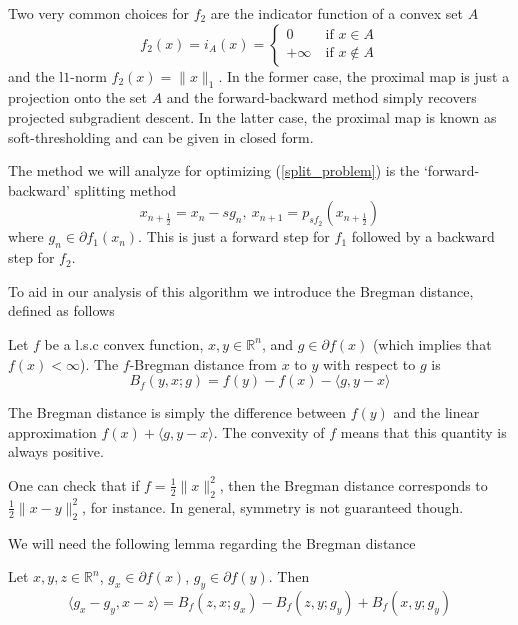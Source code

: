 Two very common choices for $f_2$ are the indicator function of a convex set $A$
\begin{equation}
 f_2(x) = i_A(x) = 
 \begin{cases}
                    0 &~ \text{if $x\in A$} \\
		    +\infty &~ \text{if $x\notin A$}
 \end{cases}
\end{equation}
and the l$1$-norm $f_2(x) = \|x\|_1$. In the former case, the proximal map is just a projection onto the set $A$ and
the forward-backward method simply recovers projected subgradient descent. In the latter case, the
proximal map is known as soft-thresholding and can be given in closed form.

The method we will analyze for optimizing (\ref{split_problem}) is the `forward-backward' splitting method
\begin{equation}\label{subgradient_forward_backward}
 x_{n+\frac{1}{2}} = x_n - sg_n,~x_{n+1} = p_{sf_2}(x_{n+\frac{1}{2}})
\end{equation}
where $g_n\in \partial f_1(x_n)$. This is just a forward step for $f_1$ followed by a backward step for
$f_2$.

To aid in our analysis of this algorithm we introduce the Bregman distance, defined as follows
\begin{definition}
 Let $f$ be a l.s.c convex function, $x, y\in \mathbb{R}^n$, and $g\in \partial f(x)$ (which implies that
 $f(x) < \infty$). The $f$-Bregman distance from $x$ to $y$ with respect to $g$ is
 \begin{equation}
  B_f(y,x;g) = f(y) - f(x) - \langle g, y - x\rangle
 \end{equation}

\end{definition}\label{bregman_distance}
The Bregman distance is simply the difference between $f(y)$ and the linear approximation
$f(x) + \langle g, y - x\rangle$. The convexity of $f$ means that this quantity is always positive.

One can check that if $f = \frac{1}{2}\|x\|_2^2$, then the Bregman distance corresponds to $\frac{1}{2}\|x - y\|_2^2$,
for instance. In general, symmetry is not guaranteed though.

We will need the following lemma regarding the Bregman distance
\begin{lemma}\label{bregman_equation_1}
 Let $x,y,z\in \mathbb{R}^n$, $g_x\in \partial f(x)$, $g_y\in \partial f(y)$. Then
 \begin{equation}
  \langle g_x - g_y, x - z\rangle = B_f(z,x;g_x) - B_f(z,y;g_y) + B_f(x,y;g_y)
 \end{equation}
 
\end{lemma}

